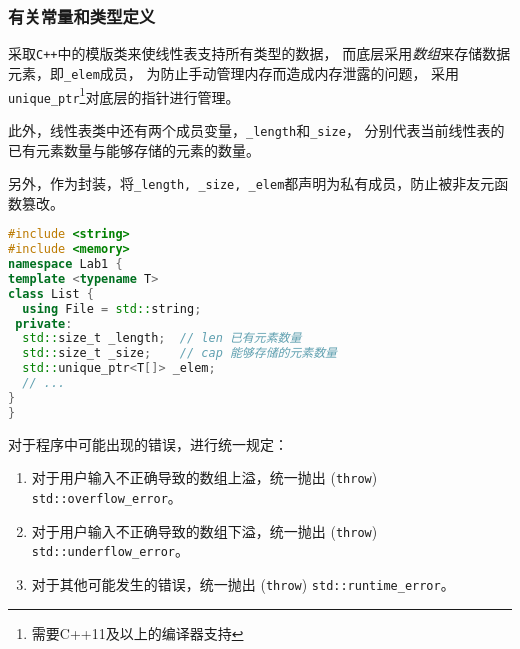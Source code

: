 \documentclass[format=draft,language=chinese,category=academic-report]{hustreport}
\begin{document}
\subsubsection{有关常量和类型定义}
采取\texttt{C++}中的模版类来使线性表支持所有类型的数据，
而底层采用\emph{数组}来存储数据元素，即\texttt{\_elem}成员，
为防止手动管理内存而造成内存泄露的问题，
采用\texttt{unique\_ptr}\footnote{需要C++11及以上的编译器支持}对底层的指针进行管理。
\par
此外，线性表类中还有两个成员变量，\texttt{\_length}和\texttt{\_size}，
分别代表当前线性表的已有元素数量与能够存储的元素的数量。
\par
另外，作为封装，将\texttt{\_length, \_size, \_elem}都声明为私有成员，防止被非友元函数篡改。
\begin{lstlisting}[language=c++]
#include <string>
#include <memory>
namespace Lab1 {
template <typename T>
class List {
  using File = std::string;
 private:
  std::size_t _length;  // len 已有元素数量
  std::size_t _size;    // cap 能够存储的元素数量
  std::unique_ptr<T[]> _elem;
  // ...
}
}
\end{lstlisting}
对于程序中可能出现的错误，进行统一规定：
\begin{enumerate}
    \item 对于用户输入不正确导致的数组上溢，统一抛出 (\texttt{throw}) \texttt{std::overflow\_error}。
    \item 对于用户输入不正确导致的数组下溢，统一抛出 (\texttt{throw}) \texttt{std::underflow\_error}。
    \item 对于其他可能发生的错误，统一抛出 (\texttt{throw}) \texttt{std::runtime\_error}。
\end{enumerate}
\end{document}
